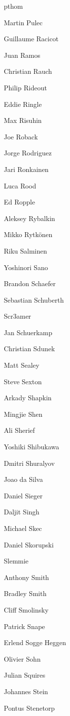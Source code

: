 \begin{DoxyItemize}
\item pthom
\item Martin Pulec
\item Guillaume Racicot
\item Juan Ramos
\item Christian Rauch
\item Philip Rideout
\item Eddie Ringle
\item Max Risuhin
\item Joe Roback
\item Jorge Rodriguez
\item Jari Ronkainen
\item Luca Rood
\item Ed Ropple
\item Aleksey Rybalkin
\item Mikko Rytkönen
\item Riku Salminen
\item Yoshinori Sano
\item Brandon Schaefer
\item Sebastian Schuberth
\item Scr3amer
\item Jan Schuerkamp
\item Christian Sdunek
\item Matt Sealey
\item Steve Sexton
\item Arkady Shapkin
\item Mingjie Shen
\item Ali Sherief
\item Yoshiki Shibukawa
\item Dmitri Shuralyov
\item Joao da Silva
\item Daniel Sieger
\item Daljit Singh
\item Michael Skec
\item Daniel Skorupski
\item Slemmie
\item Anthony Smith
\item Bradley Smith
\item Cliff Smolinsky
\item Patrick Snape
\item Erlend Sogge Heggen
\item Olivier Sohn
\item Julian Squires
\item Johannes Stein
\item Pontus Stenetorp

\end{DoxyItemize}
